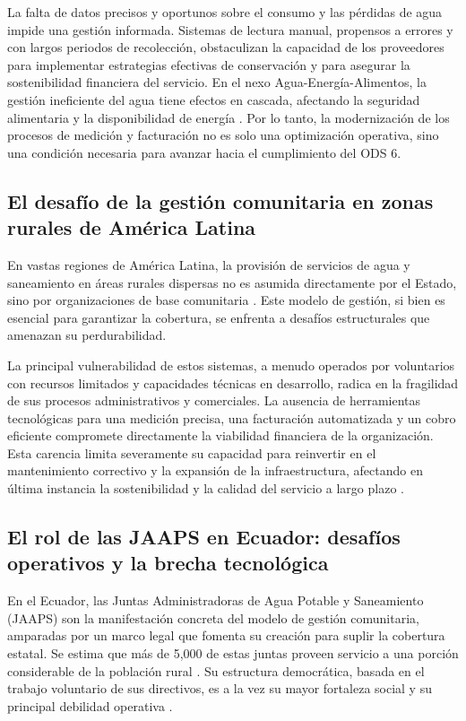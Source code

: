 La falta de datos precisos y oportunos sobre el consumo y las pérdidas de agua impide una gestión informada. Sistemas de lectura manual, propensos a errores y con largos periodos de recolección, obstaculizan la capacidad de los proveedores para implementar estrategias efectivas de conservación y para asegurar la sostenibilidad financiera del servicio. En el nexo Agua-Energía-Alimentos, la gestión ineficiente del agua tiene efectos en cascada, afectando la seguridad alimentaria y la disponibilidad de energía \parencite{RoaGarcia2019}. Por lo tanto, la modernización de los procesos de medición y facturación no es solo una optimización operativa, sino una condición necesaria para avanzar hacia el cumplimiento del ODS 6.

\subsection{El desafío de la gestión comunitaria en zonas rurales de América Latina}
\label{subsec:latam_rural_management}

En vastas regiones de América Latina, la provisión de servicios de agua y saneamiento en áreas rurales dispersas no es asumida directamente por el Estado, sino por organizaciones de base comunitaria \parencite{BID2022GestionComunitaria}. Este modelo de gestión, si bien es esencial para garantizar la cobertura, se enfrenta a desafíos estructurales que amenazan su perdurabilidad.

La principal vulnerabilidad de estos sistemas, a menudo operados por voluntarios con recursos limitados y capacidades técnicas en desarrollo, radica en la fragilidad de sus procesos administrativos y comerciales. La ausencia de herramientas tecnológicas para una medición precisa, una facturación automatizada y un cobro eficiente compromete directamente la viabilidad financiera de la organización. Esta carencia limita severamente su capacidad para reinvertir en el mantenimiento correctivo y la expansión de la infraestructura, afectando en última instancia la sostenibilidad y la calidad del servicio a largo plazo \parencite{BID2022GestionComunitaria, Toma2020}.

\subsection{El rol de las JAAPS en Ecuador: desafíos operativos y la brecha tecnológica}
\label{subsec:jaaps_ecuador}

En el Ecuador, las Juntas Administradoras de Agua Potable y Saneamiento (JAAPS) son la manifestación concreta del modelo de gestión comunitaria, amparadas por un marco legal que fomenta su creación para suplir la cobertura estatal. Se estima que más de 5,000 de estas juntas proveen servicio a una porción considerable de la población rural \parencite{BID2022GestionComunitaria}. Su estructura democrática, basada en el trabajo voluntario de sus directivos, es a la vez su mayor fortaleza social y su principal debilidad operativa \parencite{Toma2020}.

